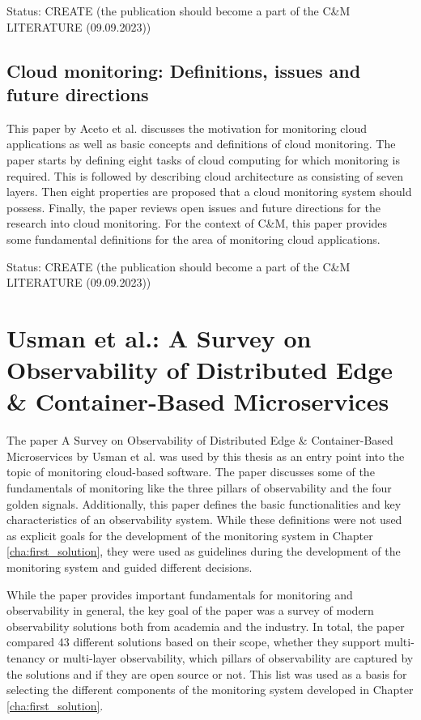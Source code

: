 Status: CREATE (the publication should become a part of the C\&M LITERATURE  (09.09.2023))

\subsection*{Cloud monitoring: Definitions, issues and future directions \cite{AB+12}}

This paper by Aceto et al. \cite{AB+12} discusses the motivation for monitoring cloud applications
as well as basic concepts and definitions of cloud monitoring. The paper starts by defining
eight tasks of cloud computing for which monitoring is required. This is followed by describing
cloud architecture as consisting of seven layers. Then eight properties are proposed that
a cloud monitoring system should possess. Finally, the paper reviews open issues and future
directions for the research into cloud monitoring. For the context of C\&M,
this paper provides some fundamental definitions for the area of monitoring cloud applications.

Status: CREATE (the publication should become a part of the C\&M LITERATURE  (09.09.2023))

\section{Usman et al.: A Survey on Observability of Distributed Edge \& Container-Based Microservices}
\label{sec:uf+22}

The paper A Survey on Observability of Distributed Edge \& Container-Based Microservices by Usman et al. \cite{UF+22}
was used by this thesis as an entry point into the topic of monitoring cloud-based software.
The paper discusses some of the fundamentals of monitoring like the three pillars of observability
and the four golden signals. Additionally, this paper defines the basic functionalities and key characteristics of an observability system.
While these definitions were not used as explicit goals for the development of the monitoring system in Chapter \ref{cha:first_solution},
they were used as guidelines during the development of the monitoring system and guided different decisions.

While the paper provides important fundamentals for monitoring and observability in general, the key goal of the paper
was a survey of modern observability solutions both from academia and the industry.
In total, the paper compared 43 different solutions based on their scope, whether they support multi-tenancy or multi-layer observability,
which pillars of observability are captured by the solutions and if they are open source or not.
This list was used as a basis for selecting the different components of the monitoring system developed in Chapter \ref{cha:first_solution}.
